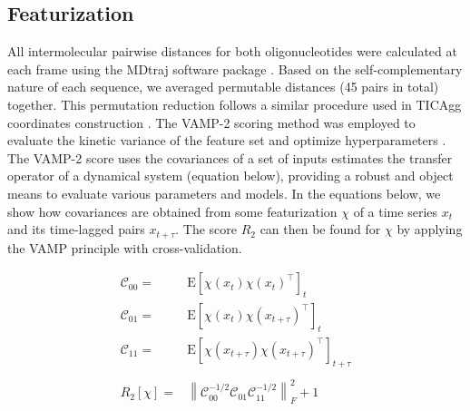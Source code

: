 \documentclass[journal=jpcbfk,manuscript=article]{achemso}
\newcommand{\Expect}[1]{\mathrm{E}\left[#1\right]}
\newcommand{\norm}[1]{\left\lVert#1\right\rVert}
\begin{document}
\subsection{\label{sec:methods}Featurization}

All intermolecular pairwise distances for both oligonucleotides were calculated at each frame using the MDtraj software package \citep{McGibbon2015MDTraj:Trajectories}. Based on the self-complementary nature of each sequence, we averaged permutable distances (45 pairs in total) together. This permutation reduction follows a similar procedure used in TICAgg coordinates construction \citep{Sengupta2019AutomatedSelf-assembly}. The VAMP-2 scoring method was employed to evaluate the kinetic variance of the feature set and optimize hyperparameters \citep{WuVariationalData, Mardt2018VAMPnetsKinetics}. The VAMP-2 score uses the covariances of a set of inputs estimates the transfer operator of a dynamical system (equation below), providing a robust and object means to evaluate various parameters and models. In the equations below, we show how covariances are obtained from some featurization $\chi$ of a time series $x_t$ and its time-lagged pairs $x_{t+\tau}$. The score $R_2$ can then be found for $\chi$ by applying the VAMP principle with cross-validation.

\begin{align}
 	\mathscr{C}_{00}=&\Expect{\chi(x_t)\chi(x_t)^\intercal}_t\\
 	\mathscr{C}_{01}=&\Expect{\chi(x_t)\chi(x_{t+\tau})^\intercal}_t\\
 	\mathscr{C}_{11}=&\Expect{\chi(x_{t+\tau})\chi(x_{t+\tau})^\intercal}_{t+\tau}\\
	\\
 	R_2[\chi]=&\norm{\mathscr{C}_{00}^{-1/2}\mathscr{C}_{01}\mathscr{C}_{11}^{-1/2}}_F^2 +1
\end{align}\label{CK1}

\end{document}
